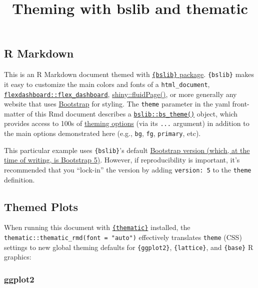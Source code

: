 \documentclass[
]{article}
\title{Theming with bslib and thematic}
\author{}
\date{\vspace{-2.5em}}
\begin{document}
\maketitle

\hypertarget{r-markdown}{%
\subsection{R Markdown}\label{r-markdown}}

This is an R Markdown document themed with
\href{https://rstudio.github.io/bslib/}{\texttt{\{bslib\}} package}.
\texttt{\{bslib\}} makes it easy to customize the main colors and fonts
of a \texttt{html\_document},
\href{https://flexdashboard-pkg.netlify.app/articles/articles/theme.html}{\texttt{flexdashboard::flex\_dashboard}},
\href{https://shiny.rstudio.com/reference/shiny/latest/fluidPage.html}{shiny::fluidPage()},
or more generally any website that uses
\href{https://getbootstrap.com/}{Bootstrap} for styling. The
\texttt{theme} parameter in the yaml front-matter of this Rmd document
describes a
\href{https://rstudio.github.io/bslib/reference/bs_theme.html}{\texttt{bslib::bs\_theme()}}
object, which provides access to 100s of
\href{https://rstudio.github.io/bslib/articles/bs5-variables.html}{theming
options} (via its \texttt{...} argument) in addition to the main options
demonstrated here (e.g., \texttt{bg}, \texttt{fg}, \texttt{primary},
etc).

This particular example uses \texttt{\{bslib\}}'s default
\href{https://rstudio.github.io/bslib/articles/bslib.html\#versions}{Bootstrap
version (which, at the time of writing, is Bootstrap 5)}. However, if
reproducibility is important, it's recommended that you ``lock-in'' the
version by adding \texttt{version:\ 5} to the \texttt{theme} definition.

\hypertarget{themed-plots}{%
\subsection{Themed Plots}\label{themed-plots}}

When running this document with
\href{https://rstudio.github.io/thematic/}{\texttt{\{thematic\}}}
installed, the \texttt{thematic::thematic\_rmd(font\ =\ "auto")}
effectively translates \texttt{theme} (CSS) settings to new global
theming defaults for \texttt{\{ggplot2\}}, \texttt{\{lattice\}}, and
\texttt{\{base\}} R graphics:

\hypertarget{ggplot2}{%
\subsubsection{ggplot2}\label{ggplot2}}
\end{document}
